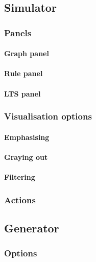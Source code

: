 \subsection{Simulator}

\subsubsection{Panels}

\paragraph{Graph panel}

\paragraph{Rule panel}

\paragraph{LTS panel}

\subsubsection{Visualisation options}

\paragraph{Emphasising}

\paragraph{Graying out}

\paragraph{Filtering}

\subsubsection{Actions}

\subsection{Generator}

\subsubsection{Options}

